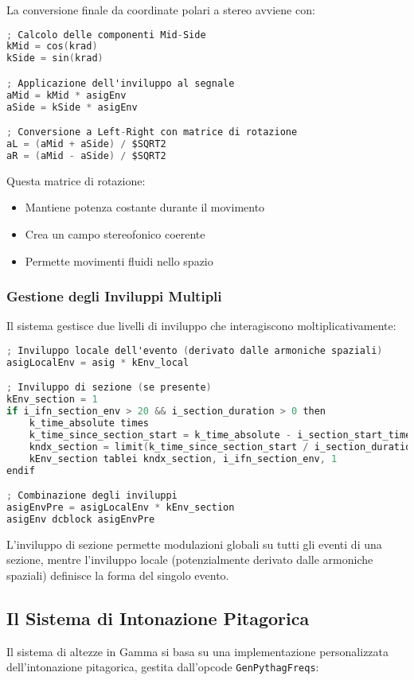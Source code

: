 La conversione finale da coordinate polari a stereo avviene con:

\begin{lstlisting}[language=C]
; Calcolo delle componenti Mid-Side
kMid = cos(krad)
kSide = sin(krad)

; Applicazione dell'inviluppo al segnale
aMid = kMid * asigEnv 
aSide = kSide * asigEnv

; Conversione a Left-Right con matrice di rotazione
aL = (aMid + aSide) / $SQRT2
aR = (aMid - aSide) / $SQRT2
\end{lstlisting}

Questa matrice di rotazione:
\begin{itemize}
    \item Mantiene potenza costante durante il movimento
    \item Crea un campo stereofonico coerente
    \item Permette movimenti fluidi nello spazio
\end{itemize}
\subsubsection{Gestione degli Inviluppi Multipli}
Il sistema gestisce due livelli di inviluppo che interagiscono moltiplicativamente:

\begin{lstlisting}[language=C]
; Inviluppo locale dell'evento (derivato dalle armoniche spaziali)
asigLocalEnv = asig * kEnv_local

; Inviluppo di sezione (se presente)
kEnv_section = 1
if i_ifn_section_env > 20 && i_section_duration > 0 then
    k_time_absolute times      
    k_time_since_section_start = k_time_absolute - i_section_start_time
    kndx_section = limit(k_time_since_section_start / i_section_duration, 0, 1)
    kEnv_section tablei kndx_section, i_ifn_section_env, 1
endif

; Combinazione degli inviluppi
asigEnvPre = asigLocalEnv * kEnv_section
asigEnv dcblock asigEnvPre
\end{lstlisting}

L'inviluppo di sezione permette modulazioni globali su tutti gli eventi di una sezione, mentre l'inviluppo locale (potenzialmente derivato dalle armoniche spaziali) definisce la forma del singolo evento.
\subsection{Il Sistema di Intonazione Pitagorica}
Il sistema di altezze in Gamma si basa su una implementazione personalizzata dell'intonazione pitagorica, gestita dall'opcode \texttt{GenPythagFreqs}:

